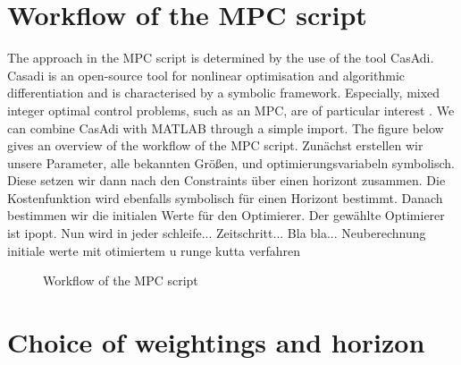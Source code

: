 \section{Workflow of the MPC script}
\label{section:workflowMPC}
The approach in the MPC script is determined by the use of the tool CasAdi. Casadi is an open-source tool for nonlinear optimisation and algorithmic differentiation and is characterised by a symbolic framework. Especially, mixed integer optimal control problems, such as an MPC, are of particular interest \cite{JoelA.E.Andersson.2018}. We can combine CasAdi with MATLAB through a simple import.\newline
The figure below gives an overview of the workflow of the MPC script. 
Zunächst erstellen wir unsere Parameter, alle bekannten Größen, und optimierungsvariabeln symbolisch. Diese setzen wir dann nach den Constraints über einen horizont zusammen. Die Kostenfunktion wird ebenfalls symbolisch für einen Horizont bestimmt.
Danach bestimmen wir die initialen Werte für den Optimierer. Der gewählte Optimierer ist ipopt.
Nun wird in jeder schleife... Zeitschritt... Bla bla...
Neuberechnung initiale werte mit otimiertem u runge kutta verfahren
\begin{figure}[h]
            \centering
            \def\svgwidth{0.6\textwidth}
            
            \caption{Workflow of the MPC script}
            \label{fig:workflowMPC}
    \end{figure}
    
\section{Choice of weightings and horizon}
\label{Choise of weigtings and horizon}
